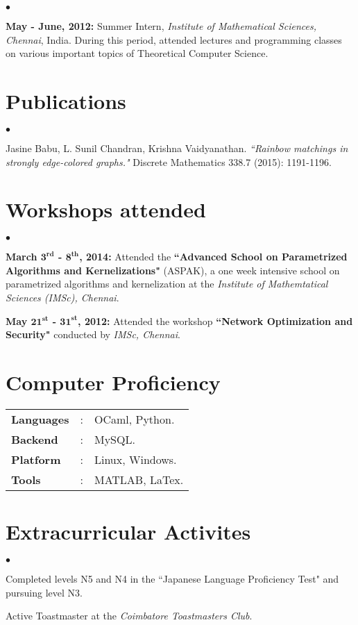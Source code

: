 \documentclass[margin,line]{res}
\newenvironment{list2}{
  \begin{list}{$\bullet$}{%
      \setlength{\itemsep}{0in}
      \setlength{\parsep}{0in} \setlength{\parskip}{0in}
      \setlength{\topsep}{0in} \setlength{\partopsep}{0in} 
      \setlength{\leftmargin}{0.2in}}}{\end{list}}
\begin{document}
\begin{resume}
\begin{list2}
\item \textbf{May - June, 2012:} Summer Intern, \textit{Institute of Mathematical Sciences, Chennai}, India. During this period, attended lectures and programming classes on various important topics of Theoretical Computer Science.
\end{list2}

\section{\sc Publications}
\begin{list2}
\item Jasine  Babu,  L.  Sunil  Chandran, Krishna  Vaidyanathan. \textit{``Rainbow matchings in strongly edge-colored graphs."} Discrete Mathematics 338.7 (2015):  1191-1196.
\end{list2}

\section{\sc Workshops attended}
\begin{list2}
\item \textbf{March $\mathbf{3^{rd}}$ - $\mathbf{8^{th}}$, 2014:} Attended the \textbf{``Advanced School on Parametrized Algorithms and Kernelizations"} (ASPAK), a one week intensive school on parametrized algorithms and kernelization at the \textit{Institute of Mathemtatical Sciences (IMSc), Chennai}.

\item  \textbf{May $\mathbf{21^{st}}$ - $\mathbf{31^{st}}$, 2012:} Attended the workshop \textbf{``Network Optimization and Security"} conducted by \textit{IMSc, Chennai}.
\end{list2}

\section{\sc Computer Proficiency}
\begin{tabular}{l l l}

\textbf{Languages}&: & OCaml, Python.\\
\textbf{Backend}&:	& MySQL.\\
\textbf{Platform}&:  & Linux, Windows.\\
\textbf{Tools}&:     &MATLAB, LaTex.\\
\end{tabular}

\section{\sc Extracurricular Activites}
\begin{list2}
\item  Completed levels N5 and N4 in the ``Japanese Language Proficiency Test" and pursuing level N3.
\item Active Toastmaster at the \textit{Coimbatore Toastmasters Club}.
\end{list2}


\end{resume}
\end{document}

